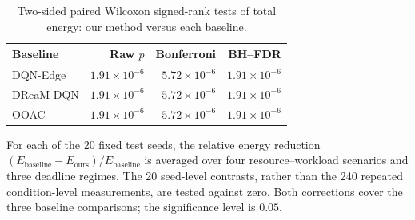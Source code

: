 \begin{table}[t]
\centering
\caption{Two-sided paired Wilcoxon signed-rank tests of total energy: our method versus each baseline.}
\label{tab:wilcoxon_energy}
\footnotesize
\setlength{\tabcolsep}{3.5pt}
\renewcommand{\arraystretch}{1.08}
\begin{tabular}{@{}lrrr@{}}
\toprule
Baseline & Raw $p$ & Bonferroni & BH--FDR \\
\midrule
DQN-Edge & $1.91\times10^{-6}$ & $5.72\times10^{-6}$ & $1.91\times10^{-6}$ \\
DReaM-DQN & $1.91\times10^{-6}$ & $5.72\times10^{-6}$ & $1.91\times10^{-6}$ \\
OOAC & $1.91\times10^{-6}$ & $5.72\times10^{-6}$ & $1.91\times10^{-6}$ \\
\bottomrule
\end{tabular}
\vspace{2pt}
\begin{minipage}{\columnwidth}
\footnotesize
For each of the 20 fixed test seeds, the relative energy reduction
$(E_{\mathrm{baseline}}-E_{\mathrm{ours}})/E_{\mathrm{baseline}}$
is averaged over four resource--workload scenarios and three deadline regimes.
The 20 seed-level contrasts, rather than the 240 repeated condition-level
measurements, are tested against zero. Both corrections cover the three
baseline comparisons; the significance level is $0.05$.
\end{minipage}
\end{table}
